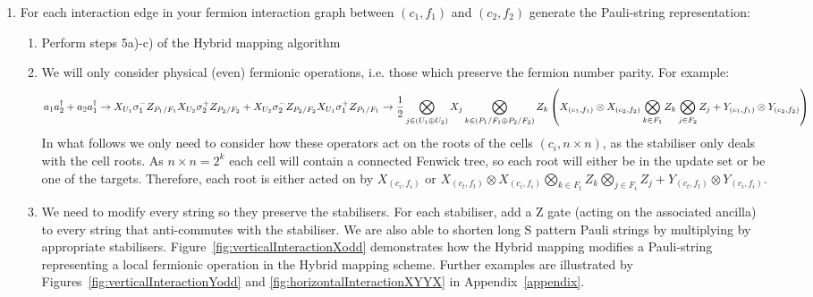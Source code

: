 \documentclass[pdftex,pra,aps,twocolumn,twoside]{revtex4-2}
\theoremstyle{plain}
\theoremstyle{note}
\newcommand\+{{\footnotesize \raisebox{0.3ex}{+}}}
\begin{document}
\begin{enumerate}
\begin{enumerate}
\begin{figure}
    \end{figure}
    \\\\This technique exploits the newly created stabiliser of the previously entangled ancilla to cancel out most of the gates required to entangle the next ancilla in the row.
    \end{enumerate}
    \item For each interaction edge in your fermion interaction graph between $(c_1, f_1)$ and $(c_2, f_2)$ generate the Pauli-string representation:
    \begin{enumerate}
        \item Perform steps 5a)-c) of the Hybrid mapping algorithm
        \item We will only consider physical (even) fermionic operations, i.e. those which preserve the fermion number parity. For example:
        \begin{dmath*}
                    a_1a^{\dagger}_2 +a_2a^{\dagger}_1  \rightarrow X_{U_1}  \sigma^-_1  Z_{P_1/F_1}  X_{U_2}  \sigma^+_2Z_{P_2/F_2} +  X_{U_2}  \sigma^-_2  Z_{P_2/F_2}  X_{U_1}  \sigma^+_1Z_{P_1/F_1}
                    \rightarrow \frac{1}{2}\bigotimes_{j \in (U_1 \oplus U_2)} X_j \bigotimes_{k \in (P_1/F_1 \oplus P_2/F_2)} Z_k \> \\ \left( X_{(c_1, f_1)} \otimes X_{(c_2, f_2)} \bigotimes_{k \in F_1} Z_k \bigotimes_{j \in F_2} Z_j  + Y_{(c_1, f_1)}  \otimes Y_{(c_2, f_2)} \right) 
            \end{dmath*}
        In what follows we only need to consider how these operators act on the roots of the cells $(c_i, n\times n)$, as the stabiliser only deals with the cell roots. As $n\times n = 2^k$ each cell will contain a connected Fenwick tree, so each root will either be in the update set or be one of the targets. Therefore, each root is either acted on by $X_{(c_i, f_i)} $ or $X_{(c_t, f_t)} \otimes X_{(c_i, f_i)} \bigotimes_{k \in F_t} Z_k \bigotimes_{j \in F_i} Z_j  + Y_{(c_t, f_t)}  \otimes Y_{(c_i, f_i)} $. 
        \item We need to modify every string so they preserve the stabilisers. For each stabiliser, add a Z gate (acting on the associated ancilla) to every string that anti-commutes with the stabiliser. We are also able to shorten long S pattern Pauli strings by multiplying by appropriate stabilisers. Figure~\ref{fig:verticalInteractionXodd} demonstrates how the Hybrid\+ mapping modifies a Pauli-string representing a local fermionic operation in the Hybrid mapping scheme. Further examples are illustrated by Figures~\ref{fig:verticalInteractionYodd} and \ref{fig:horizontalInteractionXYYX} in Appendix~\ref{appendix}.\\\\

\end{enumerate}
\end{enumerate}
\end{document}
